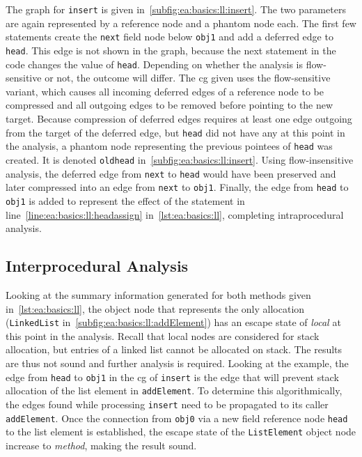 			The graph for \texttt{insert} is given in~\cref{subfig:ea:basics:ll:insert}. The two parameters are again
			represented by a reference node and a phantom node each. The first few statements create the \texttt{next} field
			node below \texttt{obj1} and add a deferred edge to \texttt{head}. This edge is not shown in the graph, because
			the next statement in the code changes the value of \texttt{head}. Depending on whether the analysis is
			flow-sensitive or not, the outcome will differ. The \gls{cg} given uses the flow-sensitive variant, which causes
			all incoming deferred edges of a reference node to be compressed and all outgoing edges to be removed before
			pointing to the new target. Because compression of deferred edges requires at least one edge outgoing from the
			target of the deferred edge, but \texttt{head} did not have any at this point in the analysis, a phantom node
			representing the previous pointees of \texttt{head} was created. It is denoted \texttt{oldhead}
			in~\cref{subfig:ea:basics:ll:insert}. Using flow-insensitive analysis, the deferred edge from \texttt{next} to
			\texttt{head} would have been preserved and later compressed into an edge from \texttt{next} to \texttt{obj1}.
			Finally, the edge from \texttt{head} to \texttt{obj1} is added to represent the effect of the statement in
			line~\ref{line:ea:basics:ll:headassign} in~\cref{lst:ea:basics:ll}, completing intraprocedural analysis.

		\subsection{Interprocedural Analysis}
			\label{sub:ea:basics:global}
			Looking at the summary information generated for both methods given in~\cref{lst:ea:basics:ll}, the object node
			that represents the only allocation (\texttt{LinkedList} in~\cref{subfig:ea:basics:ll:addElement}) has an escape
			state of \emph{local} at this point in the analysis. Recall that local nodes are considered for stack allocation,
			but entries of a linked list cannot be allocated on stack. The results are thus not sound and further analysis is
			required. Looking at the example, the edge from \texttt{head} to \texttt{obj1} in the \gls{cg} of \texttt{insert}
			is the edge that will prevent stack allocation of the list element in \texttt{addElement}. To determine this
			algorithmically, the edges found while processing \texttt{insert} need to be propagated to its caller
			\texttt{addElement}. Once the connection from \texttt{obj0} via a new field reference node \texttt{head} to the
			list element is established, the escape state of the \texttt{ListElement} object node increase to \emph{method},
			making the result sound.


